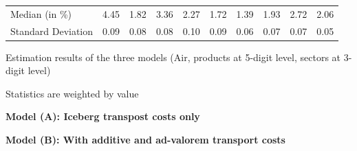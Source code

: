 \documentclass[11pt,twoside, authoryear]{elsarticle}
\begin{document}
\begin{table}[htbp]
{\begin{tabular}{l|c c c c c c c c c}
    Median (in \%)& \multicolumn{1}{c}{4.45} & \multicolumn{1}{c}{1.82} & \multicolumn{1}{c}{3.36} & \multicolumn{1}{c}{2.27} & \multicolumn{1}{c}{1.72} & \multicolumn{1}{c}{1.39} & \multicolumn{1}{c}{1.93} & \multicolumn{1}{c}{2.72} & \multicolumn{1}{c}{2.06} \\
    Standard Deviation & \multicolumn{1}{c}{0.09} & \multicolumn{1}{c}{0.08} & \multicolumn{1}{c}{0.08} & \multicolumn{1}{c}{0.10} & \multicolumn{1}{c}{0.09} & \multicolumn{1}{c}{0.06} & \multicolumn{1}{c}{0.07} & \multicolumn{1}{c}{0.07} & \multicolumn{1}{c}{0.05} \\  \hline \hline
    \end{tabular}
    }
\end{table}%

\begin{table}[htbp]
	\centering
	\footnotesize{
	\caption{Estimation results of the three models (Air, products at 5-digit level, sectors at 3-digit level)}
	\label{tab:3models_estimation_results_air}%
	
   \begin{tablenotes}
	\tiny
	\item Statistics are weighted by value
	\item \textbf{Model (A): Iceberg transpost costs only}
	\item \textbf{Model (B): With additive and ad-valorem transport costs}
\end{tablenotes}

}	
\end{table}%
\end{document}
